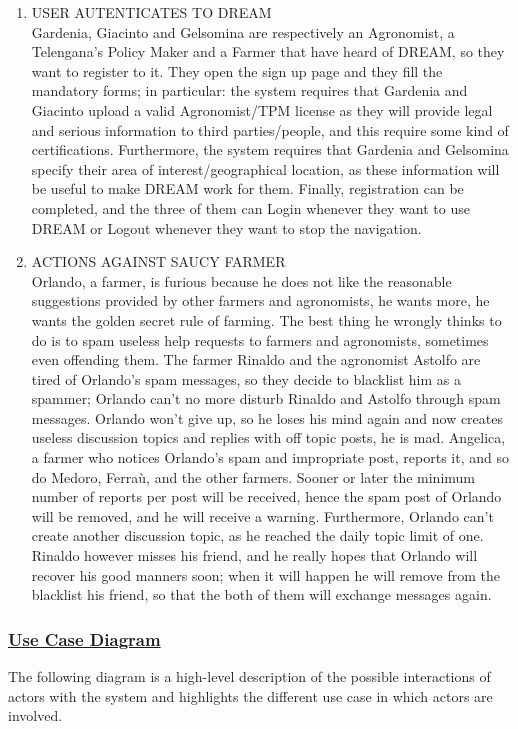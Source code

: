 \begin{enumerate}[label=\textbf{SCENARIO \arabic*}]
			\item \label{sce:sce9} USER AUTENTICATES TO DREAM \\
			Gardenia, Giacinto and Gelsomina are respectively an Agronomist, a Telengana's Policy Maker and a Farmer that have heard of DREAM, so they want to register to it. They open the sign up page and they fill the mandatory forms; in particular: the system requires that Gardenia and Giacinto upload a valid Agronomist/TPM license as they will provide legal and serious information to third parties/people, and this require some kind of certifications. Furthermore, the system requires that Gardenia and Gelsomina specify their area of interest/geographical location, as these information will be useful to make DREAM work for them. Finally, registration can be completed, and the three of them can Login whenever they want to use DREAM or Logout whenever they want to stop the navigation.
			
			\item \label{sce:sce10} ACTIONS AGAINST SAUCY FARMER \\
			Orlando, a farmer, is furious because he does not like the reasonable suggestions provided by other farmers and agronomists, he wants more, he wants the golden secret rule of farming.
			The best thing he wrongly thinks to do is to spam useless help requests to farmers and agronomists, sometimes even offending them. The farmer Rinaldo and the agronomist Astolfo are tired of Orlando's spam messages, so they decide to blacklist him as a spammer; Orlando can't no more disturb Rinaldo and Astolfo through spam messages.
			Orlando won't give up, so he loses his mind again and now creates useless discussion topics and replies with off topic posts, he is mad. Angelica, a farmer who notices Orlando's spam and impropriate post, reports it, and so do Medoro, Ferraù, and the other farmers. Sooner or later the minimum number of reports per post will be received, hence the spam post of Orlando will be removed, and he will receive a warning. Furthermore, Orlando can't create another discussion topic, as he reached the daily topic limit of one.
			Rinaldo however misses his friend, and he really hopes that Orlando will recover his good manners soon; when it will happen he will remove from the blacklist his friend, so that the both of them will exchange messages again.
		\end{enumerate}
	
		\newpage
		
	\subsubsection[Use Cases Diagrams]{\hyperlink{toc}{Use Case Diagram}}
		The following diagram is a high-level description of the possible interactions of actors with the system and highlights the different use case in which actors are involved.
		
